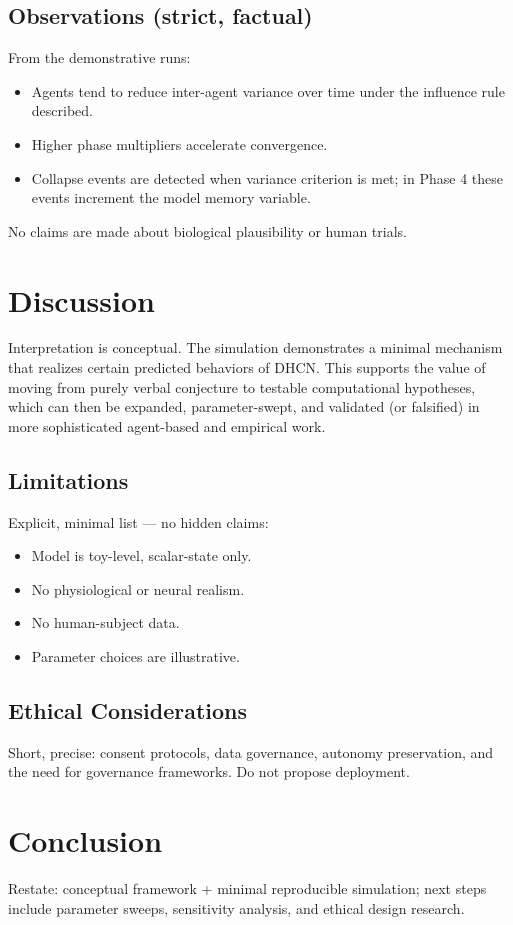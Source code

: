 \documentclass[12pt]{article}
\begin{document}
\subsection{Observations (strict, factual)}
From the demonstrative runs:
\begin{itemize}
  \item Agents tend to reduce inter-agent variance over time under the influence rule described.
  \item Higher phase multipliers accelerate convergence.
  \item Collapse events are detected when variance criterion is met; in Phase 4 these events increment the model memory variable.
\end{itemize}
No claims are made about biological plausibility or human trials.

\section{Discussion}
Interpretation is conceptual. The simulation demonstrates a minimal mechanism that realizes certain predicted behaviors of DHCN. This supports the value of moving from purely verbal conjecture to testable computational hypotheses, which can then be expanded, parameter-swept, and validated (or falsified) in more sophisticated agent-based and empirical work.

\subsection{Limitations}
Explicit, minimal list — no hidden claims:
\begin{itemize}
  \item Model is toy-level, scalar-state only.
  \item No physiological or neural realism.
  \item No human-subject data.
  \item Parameter choices are illustrative.
\end{itemize}

\subsection{Ethical Considerations}
Short, precise: consent protocols, data governance, autonomy preservation, and the need for governance frameworks. Do not propose deployment.

\section{Conclusion}
Restate: conceptual framework + minimal reproducible simulation; next steps include parameter sweeps, sensitivity analysis, and ethical design research.
\end{document}
